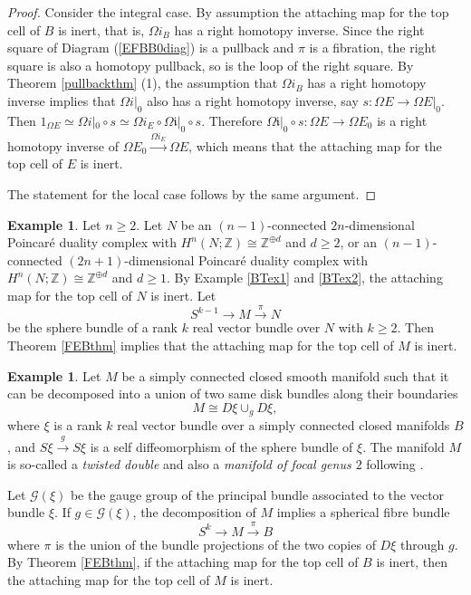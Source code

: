 \documentclass[a4]{amsart}
\theoremstyle{definition}
\newtheorem{example}[theorem]{Example}
\begin{document}
\begin{sloppypar}
\begin{proof}
Consider the integral case. By assumption the attaching map for the top cell of $B$ is inert, that is, $\Omega i_B$ has a right homotopy inverse. 
Since the right square of Diagram (\ref{EFBB0diag}) is a pullback and $\pi$ is a fibration, the right square is also a homotopy pullback, so is the loop of the right square. 
By Theorem \ref{pullbackthm} (1), the assumption that $\Omega i_B$ has a right homotopy inverse implies that $\Omega i|_{0}$ also has a right homotopy inverse, say $s: \Omega E\stackrel{}{\longrightarrow} \Omega E|_{0}$. Then $1_{\Omega E}\simeq \Omega i|_{0}\circ  s\simeq  \Omega i_E\circ \Omega \mathfrak{i}|_0\circ  s$. Therefore $\Omega \mathfrak{i}|_0\circ  s: \Omega E\stackrel{}{\longrightarrow} \Omega E_0$ is a right homotopy inverse of $\Omega E_0 \stackrel{\Omega i_E}{\longrightarrow} \Omega E$, which means that the attaching map for the top cell of $E$ is inert.

The statement for the local case follows by the same argument. 
\end{proof}

\begin{example}\label{Huafibex}
Let $n\geq 2$. 
Let $N$ be an $(n-1)$-connected $2n$-dimensional Poincar\'{e} duality complex with $H^n(N;\mathbb{Z})\cong \mathbb{Z}^{\oplus d}$ and $d\geq 2$, or an $(n-1)$-connected $(2n+1)$-dimensional Poincar\'{e} duality complex with $H^n(N;\mathbb{Z})\cong \mathbb{Z}^{\oplus d}$ and $d\geq 1$. 
By Example \ref{BTex1} and \ref{BTex2}, the attaching map for the top cell of $N$ is inert. 
Let 
\[
S^{k-1}\stackrel{}{\longrightarrow} M\stackrel{\pi}{\longrightarrow} N
\]
be the sphere bundle of a rank $k$ real vector bundle over $N$ with $k\geq 2$. Then Theorem \ref{FEBthm} implies that the attaching map for the top cell of $M$ is inert.
\end{example}


\begin{example}\label{DVex}
Let $M$ be a simply connected closed smooth manifold such that it can be decomposed into a union of two same disk bundles along their boundaries
\[
M\cong D\xi\cup_g D\xi,
\]
where $\xi$ is a rank $k$ real vector bundle over a simply connected closed manifolds $B$, and $S\xi\stackrel{g}{\rightarrow} S\xi$ is a self diffeomorphism of the sphere bundle of $\xi$. The manifold $M$ is so-called a {\it twisted double} and also a {\it manifold of focal genus $2$} following \cite{Dua11}. 

Let $\mathcal{G}(\xi)$ be the gauge group of the principal bundle associated to the vector bundle $\xi$. If $g\in \mathcal{G}(\xi)$, the decomposition of $M$ implies a spherical fibre bundle
\[
S^k\stackrel{}{\longrightarrow} M\stackrel{\pi}{\longrightarrow} B
\]
where $\pi$ is the union of the bundle projections of the two copies of $D\xi$ through $g$. By Theorem \ref{FEBthm}, if the attaching map for the top cell of $B$ is inert, then the attaching map for the top cell of $M$ is inert. 



\end{example}
\end{sloppypar}
\end{document}
